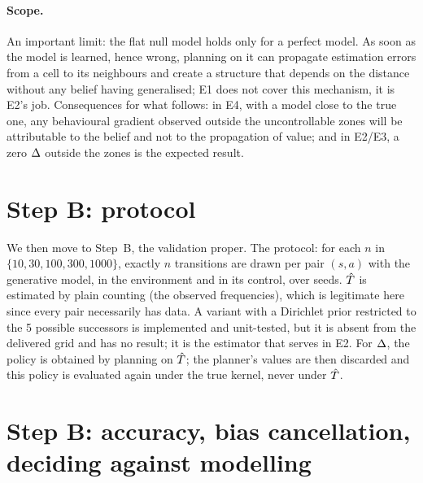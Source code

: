 \documentclass[10pt]{article}
\begin{document}
\paragraph{Scope.}
An important limit: the flat null model holds only for a perfect model.
As soon as the model is learned, hence wrong, planning on it can propagate estimation errors from a cell to its
neighbours and create a structure that depends on the distance without any belief having generalised; E1 does not cover
this mechanism, it is E2's job.
Consequences for what follows: in E4, with a model close to the true one, any behavioural gradient observed outside the
uncontrollable zones will be attributable to the belief and not to the propagation of value;
and in E2/E3, a zero $\Delta$ outside the zones is the expected result.

\section{Step B: protocol}
\label{sec:stepB}

We then move to Step~B, the validation proper.
The protocol: for each $n$ in $\{10, 30, 100, 300, 1000\}$, exactly $n$ transitions are drawn per pair $(s, a)$ with the %
generative model, in the environment and in its control, over \eOneNSeeds{} seeds.
$\hat{T}$ is estimated by plain counting (the observed frequencies), which is legitimate here since every pair necessarily
has data.
A variant with a Dirichlet prior restricted to the 5 possible successors is implemented and unit-tested, but it is %
absent from the delivered grid and has no result; it is the estimator that serves in E2.
For $\Delta$, the policy is obtained by planning on $\hat{T}$; the planner's values are then discarded and this policy is
evaluated again under the true kernel, never under $\hat{T}$.

\section{Step B: accuracy, bias cancellation, deciding against modelling}
\label{sec:results}
\end{document}
